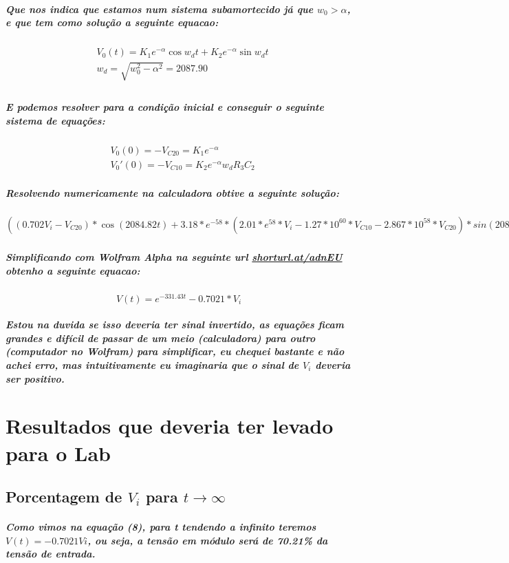 \documentclass[12pt,twoside, a4paper, twocolumn]{article}
\begin{document}
{\subparagraph*{Que nos indica que estamos num sistema subamortecido já que $w_0 > \alpha$, e que tem como solução a seguinte equacao:}

\begin{equation}
    \begin{aligned}
         & V_0(t) = K_1 e^{-\alpha} \cos{w_d t} + K_2 e^{-\alpha} \sin{w_d t} \\
         & w_d = \sqrt{w_0^2 - \alpha^2} = 2087.90                            \\
    \end{aligned}
\end{equation}

\subparagraph*{E podemos resolver para a condição inicial e conseguir o seguinte sistema de equações:}

\begin{equation}
    \begin{aligned}
         & V_0(0) = -V_{C20} = K_1 e^{-\alpha}              \\
         & V_0'(0) = -V_{C10} = K_2 e^{-\alpha} w_d R_3 C_2
    \end{aligned}
\end{equation}

\subparagraph*{Resolvendo numericamente na calculadora obtive a seguinte solução:}

\subparagraph*{$((0.702 V_i - V_{C20})*\cos{(2084.82t)}+3.18*e^{-58}*(2.01*e^{58}*V_i-1.27*10^{60}*V_{C10}-2.867*10^{58}*V_{C20})*sin(2084.82t))*e^{(-331.43t)} - 0.7021 * V_i$}


\subparagraph*{Simplificando com Wolfram Alpha na seguinte url \url{shorturl.at/adnEU} obtenho a seguinte equacao:}

\begin{equation}
    V(t) = e^{-331.43t} - 0.7021 * V_i
\end{equation}

\subparagraph*{Estou na duvida se isso deveria ter sinal invertido, as equações ficam grandes e difícil de passar de um meio (calculadora) para outro (computador no Wolfram) para simplificar, eu chequei bastante e não achei erro, mas intuitivamente eu imaginaria que o sinal de $V_i$ deveria ser positivo.}

\section{Resultados que deveria ter levado para o Lab}

\subsection{Porcentagem de $V_i$ para $t \rightarrow \infty$}
\subparagraph*{Como vimos na equação (8), para t tendendo a infinito teremos $V(t) = -0.7021 Vi$, ou seja, a tensão em módulo será de 70.21\% da tensão de entrada.}

}
\end{document}

